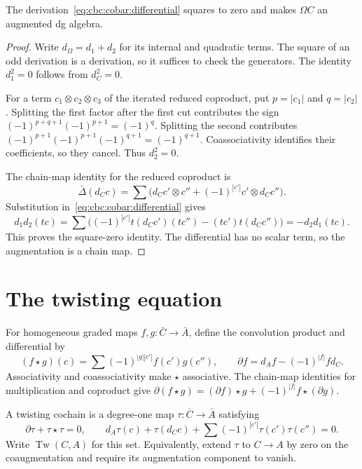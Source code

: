 \begin{proposition}\label{cbc:cobar:square}
The derivation~\eqref{eq:cbc:cobar:differential} squares to zero and makes $\Omega C$ an augmented dg algebra.
\end{proposition}
\begin{proof}
Write $d_\Omega=d_1+d_2$ for its internal and quadratic terms.
The square of an odd derivation is a derivation, so it suffices to check the generators.
The identity $d_1^2=0$ follows from $d_C^2=0$.

For a term $c_1\otimes c_2\otimes c_3$ of the iterated reduced coproduct, put $p=|c_1|$ and $q=|c_2|$.
Splitting the first factor after the first cut contributes the sign
$(-1)^{p+q+1}(-1)^{p+1}=(-1)^q$.
Splitting the second contributes
$(-1)^{p+1}(-1)^{p+1}(-1)^{q+1}=(-1)^{q+1}$.
Coassociativity identifies their coefficients, so they cancel.
Thus $d_2^2=0$.

The chain-map identity for the reduced coproduct is
\[
 \bar\Delta(d_Cc)
 =\sum\bigl(d_Cc'\otimes c''+(-1)^{|c'|}c'\otimes d_Cc''\bigr).
\]
Substitution in~\eqref{eq:cbc:cobar:differential} gives
\[
 d_1d_2(tc)=\sum\bigl((-1)^{|c'|}t(d_Cc')(tc'')-(tc')t(d_Cc'')\bigr)
             =-d_2d_1(tc).
\]
This proves the square-zero identity.
The differential has no scalar term, so the augmentation is a chain map.
\end{proof}

\section{The twisting equation}
For homogeneous graded maps $f,g:\bar C\to\bar A$, define the convolution product and differential by
\[
 (f\star g)(c)=\sum(-1)^{|g||c'|}f(c')g(c''),
 \qquad \partial f=d_Af-(-1)^{|f|}fd_C.
\]
Associativity and coassociativity make $\star$ associative.
The chain-map identities for multiplication and coproduct give
$\partial(f\star g)=(\partial f)\star g+(-1)^{|f|}f\star(\partial g)$.

\begin{definition}\label{cbc:cobar:twisting}
A twisting cochain is a degree-one map $\tau:\bar C\to\bar A$ satisfying
\begin{equation}\label{eq:cbc:cobar:MC}
 \partial\tau+\tau\star\tau=0,
 \qquad
 d_A\tau(c)+\tau(d_Cc)+\sum(-1)^{|c'|}\tau(c')\tau(c'')=0.
\end{equation}
Write $\operatorname{Tw}(C,A)$ for this set.
Equivalently, extend $\tau$ to $C\to A$ by zero on the coaugmentation and require its augmentation component to vanish.
\end{definition}

